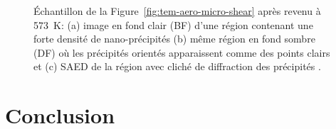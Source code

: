 \begin{figure}[h]
  \centering{}
  \caption{\label{fig:tem-aero-nano}Échantillon de la Figure~\ref{fig:tem-aero-micro-shear} après revenu à \SI{573}{\kelvin}: (a) image en fond clair (BF) d'une région contenant une forte densité de nano-précipités (b) même région en fond sombre (DF) où les précipités orientés apparaissent comme des points clairs et (c) SAED de la région avec cliché de diffraction des précipités .}
\end{figure}

\clearpage\section{Conclusion}


